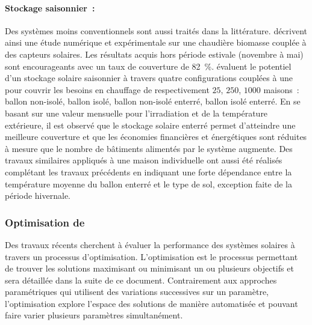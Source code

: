 \paragraph{Stockage saisonnier~:} %
\label{par:stockage_saisonnier}
Des systèmes moins conventionnels sont aussi traités dans la littérature.
\textcite{Hartl2012623} décrivent ainsi une étude numérique et expérimentale sur une
chaudière biomasse couplée à des capteurs solaires. Les résultats acquis hors période
estivale (novembre à mai) sont encourageants avec un taux de couverture de
\SI{82}{\percent}. \textcite{Ucar20082532} évaluent le potentiel d’un stockage
solaire saisonnier à travers quatre configurations couplées à une  pour couvrir les
besoins en chauffage de respectivement $25$, $250$, $1000$ maisons~: ballon non-isolé,
ballon isolé, ballon non-isolé enterré, ballon isolé enterré. En se basant sur une
valeur mensuelle pour l’irradiation et de la température extérieure, il est observé que
le stockage solaire enterré permet d’atteindre une meilleure couverture et que les
économies financières et énergétiques sont réduites à mesure que le nombre de bâtiments
alimentés par le système augmente. Des travaux similaires appliqués à une maison
individuelle ont aussi été réalisés \parencite{Yumrutas2012983} complétant les travaux
précédents en indiquant une forte dépendance entre la température moyenne du ballon enterré
et le type de sol, exception faite de la période hivernale.


\subsubsection{Optimisation de } %
\label{ssub:optimisation_de_ssc}
Des travaux récents cherchent à évaluer la performance des systèmes solaires à travers
un processus d’optimisation. L’optimisation est le processus permettant de trouver les
solutions maximisant ou minimisant un ou plusieurs objectifs et sera détaillée dans la
suite de ce document. Contrairement aux approches paramétriques qui utilisent des variations
successives sur un paramètre, l’optimisation explore l’espace des solutions de manière automatisée
et pouvant faire varier plusieurs paramètres simultanément.

